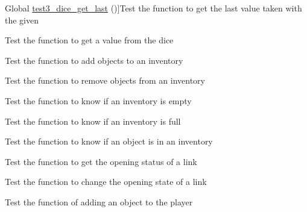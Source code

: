 \begin{DoxyRefList}
%
Global \hyperlink{dice__test_8c_a80cc6894dcbee3feacca7da1b3cc82a3}{test3\+\_\+dice\+\_\+get\+\_\+last} ()]Test the function to get the last value taken with the given  
\item[\label{test__test000052}%
\Hypertarget{test__test000052}%
Global \hyperlink{dice__test_8c_ab5b06d8e4cc2530d644b753d78a63314}{test3\+\_\+dice\+\_\+roll} ()]Test the function to get a value from the dice  
\item[\label{test__test000063}%
\Hypertarget{test__test000063}%
Global \hyperlink{inventory__test_8c_ada5ad194dfe9af537c6b2805bf38910d}{test3\+\_\+inventory\+\_\+add} ()]Test the function to add objects to an inventory  
\item[\label{test__test000066}%
\Hypertarget{test__test000066}%
Global \hyperlink{inventory__test_8c_a030d6ca8db55a616fe0804b3d0c0c144}{test3\+\_\+inventory\+\_\+dell} ()]Test the function to remove objects from an inventory  
\item[\label{test__test000078}%
\Hypertarget{test__test000078}%
Global \hyperlink{inventory__test_8c_a8cf624674fe17e81eedcb5801f106016}{test3\+\_\+inventory\+\_\+is\+\_\+emty} ()]Test the function to know if an inventory is empty  
\item[\label{test__test000075}%
\Hypertarget{test__test000075}%
Global \hyperlink{inventory__test_8c_a540dbcbfd29bd63590d081e496f8227f}{test3\+\_\+inventory\+\_\+is\+\_\+full} ()]Test the function to know if an inventory is full  
\item[\label{test__test000069}%
\Hypertarget{test__test000069}%
Global \hyperlink{inventory__test_8c_a3adf29b420e3d91803c1dd71f374b468}{test3\+\_\+inventory\+\_\+is\+\_\+object} ()]Test the function to know if an object is in an inventory  
\item[\label{test__test000096}%
\Hypertarget{test__test000096}%
Global \hyperlink{link__test_8c_a316b5e1d082f5f7133529044b70caaaa}{test3\+\_\+link\+\_\+is\+\_\+open} ()]Test the function to get the opening status of a link  
\item[\label{test__test000091}%
\Hypertarget{test__test000091}%
Global \hyperlink{link__test_8c_ad4391bca80133c2afaa73a0e520b546e}{test3\+\_\+link\+\_\+set\+\_\+open} ()]Test the function to change the opening state of a link  
\item[\label{test__test000119}%
\Hypertarget{test__test000119}%
Global \hyperlink{player__test_8c_ac984e5292c95002644a7af4fa499d0fb}{test3\+\_\+player\+\_\+add\+\_\+object} ()]Test the function of adding an object to the player  

\end{DoxyRefList}
